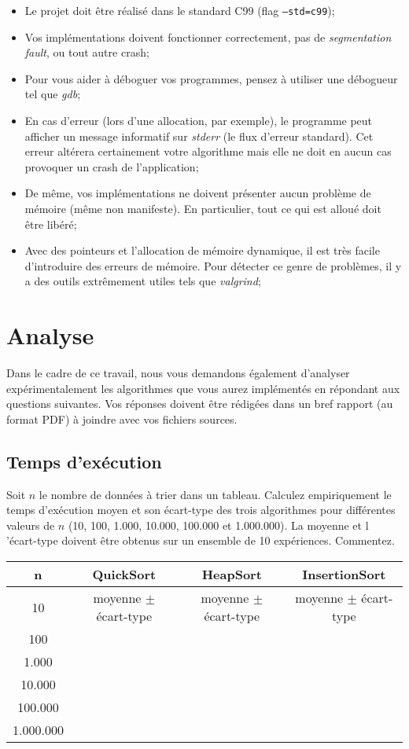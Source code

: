 \documentclass[a4paper,10pt]{article}
\begin{document}
\begin{itemize}
\item Le projet doit être réalisé dans le standard C99 (flag \texttt{--std=c99});
\item Vos implémentations doivent fonctionner correctement, pas de {\em segmentation fault}, ou tout autre crash;
\item Pour vous aider à déboguer vos programmes, pensez à utiliser une débogueur tel que {\em gdb};
\item En cas d'erreur (lors d'une allocation, par exemple), le programme peut afficher un message informatif sur {\em stderr} (le flux d'erreur standard). Cet erreur altérera certainement votre algorithme mais elle ne doit en aucun cas provoquer un crash de l'application;
\item De même, vos implémentations ne doivent présenter aucun problème de mémoire (même non manifeste). En particulier, tout ce qui est alloué doit être libéré;
\item Avec des pointeurs et l’allocation de mémoire dynamique, il est très facile d’introduire des erreurs de mémoire. Pour détecter ce genre de problèmes, il y a des outils extrêmement utiles tels que {\em valgrind};
\end{itemize}

\section{Analyse}

Dans le cadre de ce travail, nous vous demandons également d'analyser
expérimentalement les algorithmes que vous aurez implémentés en répondant aux
questions suivantes. Vos réponses doivent être rédigées dans un bref rapport (au
format PDF) à joindre avec vos fichiers sources.

\subsection{Temps d'exécution}

Soit $n$ le nombre de données à trier dans un tableau. Calculez empiriquement le
temps d'exécution moyen et son écart-type des trois algorithmes pour différentes
valeurs de $n$ (10, 100, 1.000, 10.000, 100.000 et 1.000.000). La moyenne et l
'écart-type doivent être obtenus sur un ensemble de 10 expériences. Commentez.

\begin{center}
\begin{tabular}{cccc}
	\hline
	n & QuickSort & HeapSort & InsertionSort \\
	\hline
	10 & moyenne $\pm$ écart-type & moyenne $\pm$ écart-type & moyenne $\pm$ écart-type\\
	100 & & &\\
	1.000 & & &\\
	10.000 & & &\\
	100.000 & & &\\
	1.000.000 & & &\\
\end{tabular}
\end{center}
\end{document}
